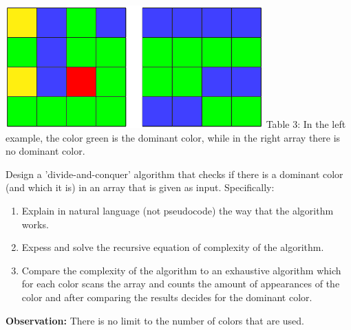 \documentclass[12pt]{article}
\begin{document}
\begin{center}
\includegraphics{arrays} \newline
Table 3:
In the left example, the color green is the dominant color, while in the right array there is no dominant color.
\end{center}
Design a 'divide-and-conquer' algorithm that checks if there is a dominant color (and which it is) in an array that is given as input. Specifically:
\begin{enumerate}
\item Explain in natural language (not pseudocode) the way that the algorithm works.
\item Expess and solve the recursive equation of complexity of the algorithm.
\item Compare the complexity of the algorithm to an exhaustive algorithm which for each color scans the array and counts the amount of appearances of the color and after comparing the results decides for the dominant color.
\end{enumerate}
\textbf{Observation:} There is no limit to the number of colors that are used.
\end{document}
